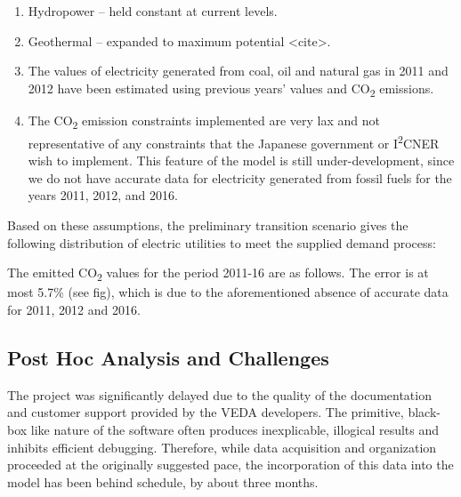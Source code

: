 \documentclass[14pt,a4paper]{article} %
\begin{document}
\begin{enumerate}
\item Hydropower – held constant at current levels.

\item Geothermal – expanded to maximum potential <cite>.

\item The values of electricity generated from coal, oil and natural gas in 2011 and 2012 have been estimated using previous years’ values and CO\textsubscript{2} emissions.

\item The CO\textsubscript{2} emission constraints implemented are very lax and not representative of any constraints that the Japanese government or I\textsuperscript{2}CNER wish to implement. This feature of the model is still under-development, since we do not have accurate data for electricity generated from fossil fuels for the years 2011, 2012, and 2016.

\end{enumerate}

Based on these assumptions, the preliminary transition scenario gives the following distribution of electric utilities to meet the supplied demand process:


The emitted CO\textsubscript{2} values for the period 2011-16 are as follows. The error is at most 5.7\% (see fig), which is due to the aforementioned absence of accurate data for 2011, 2012 and 2016. 

\subsection{Post Hoc Analysis and Challenges} 

The project was significantly delayed due to the quality of the documentation and customer support provided by the VEDA developers. The primitive, black-box like nature of the software often produces inexplicable, illogical results and inhibits efficient debugging. Therefore, while data acquisition and organization proceeded at the originally suggested pace, the incorporation of this data into the model has been behind schedule, by about three months. \\
\end{document}
